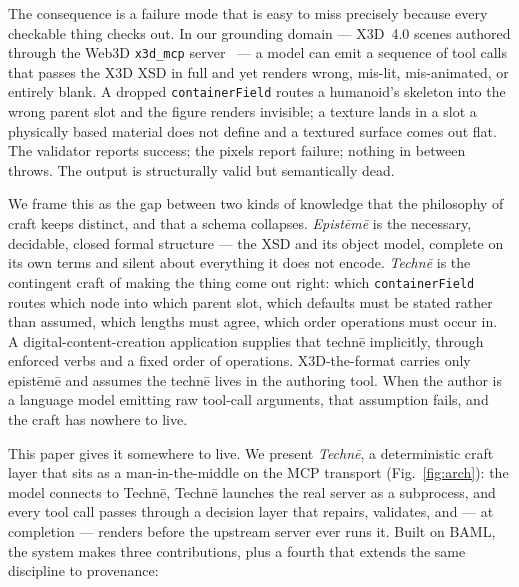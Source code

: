 \documentclass[sigconf,nonacm,screen,anonymous]{acmart}
\begin{document}
The consequence is a failure mode that is easy to miss precisely because every checkable thing checks out. In our grounding domain --- X3D~4.0 scenes authored through the Web3D \texttt{x3d\_mcp} server~\cite{x3d4,x3dpy} --- a model can emit a sequence of tool calls that passes the X3D XSD in full and yet renders wrong, mis-lit, mis-animated, or entirely blank. A dropped \texttt{containerField} routes a humanoid's skeleton into the wrong parent slot and the figure renders invisible; a texture lands in a slot a physically based material does not define and a textured surface comes out flat. The validator reports success; the pixels report failure; nothing in between throws. The output is structurally valid but semantically dead.

We frame this as the gap between two kinds of knowledge that the philosophy of craft keeps distinct, and that a schema collapses. \emph{Epistēmē} is the necessary, decidable, closed formal structure --- the XSD and its object model, complete on its own terms and silent about everything it does not encode. \emph{Technē} is the contingent craft of making the thing come out right: which \texttt{containerField} routes which node into which parent slot, which defaults must be stated rather than assumed, which lengths must agree, which order operations must occur in. A digital-content-creation application supplies that technē implicitly, through enforced verbs and a fixed order of operations. X3D-the-format carries only epistēmē and assumes the technē lives in the authoring tool. When the author is a language model emitting raw tool-call arguments, that assumption fails, and the craft has nowhere to live.

This paper gives it somewhere to live. We present \emph{Technē}, a deterministic craft layer that sits as a man-in-the-middle on the MCP transport (Fig.~\ref{fig:arch}): the model connects to Technē, Technē launches the real server as a subprocess, and every tool call passes through a decision layer that repairs, validates, and --- at completion --- renders before the upstream server ever runs it. Built on BAML, the system makes three contributions, plus a fourth that extends the same discipline to provenance:
\end{document}
